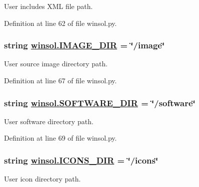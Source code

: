 User includes XML file path. 



Definition at line 62 of file winsol.py.\hypertarget{namespacewinsol_c38909a4db335a6aac960e8eb9134338}{
\subsubsection[IMAGE\_\-DIR]{\setlength{\rightskip}{0pt plus 5cm}string \hyperlink{namespacewinsol_c38909a4db335a6aac960e8eb9134338}{winsol.IMAGE\_\-DIR} = \char`\"{}/image\char`\"{}}}
\label{namespacewinsol_c38909a4db335a6aac960e8eb9134338}


User source image directory path. 



Definition at line 67 of file winsol.py.\hypertarget{namespacewinsol_5d62034814a3e2376f045046fb8e597d}{
\subsubsection[SOFTWARE\_\-DIR]{\setlength{\rightskip}{0pt plus 5cm}string \hyperlink{namespacewinsol_5d62034814a3e2376f045046fb8e597d}{winsol.SOFTWARE\_\-DIR} = \char`\"{}/software\char`\"{}}}
\label{namespacewinsol_5d62034814a3e2376f045046fb8e597d}


User software directory path. 



Definition at line 69 of file winsol.py.\hypertarget{namespacewinsol_cde697082cf908bfad7af04aae9ae3f7}{
\subsubsection[ICONS\_\-DIR]{\setlength{\rightskip}{0pt plus 5cm}string \hyperlink{namespacewinsol_cde697082cf908bfad7af04aae9ae3f7}{winsol.ICONS\_\-DIR} = \char`\"{}/icons\char`\"{}}}
\label{namespacewinsol_cde697082cf908bfad7af04aae9ae3f7}


User icon directory path. 



